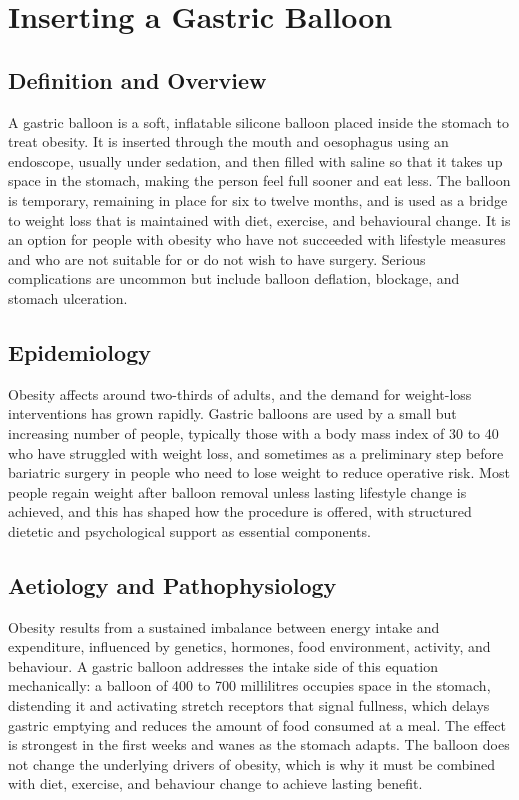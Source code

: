 \chapter{Inserting a Gastric Balloon}

\section*{Definition and Overview}
A gastric balloon is a soft, inflatable silicone balloon placed inside the stomach to treat obesity. It is inserted through the mouth and oesophagus using an endoscope, usually under sedation, and then filled with saline so that it takes up space in the stomach, making the person feel full sooner and eat less. The balloon is temporary, remaining in place for six to twelve months, and is used as a bridge to weight loss that is maintained with diet, exercise, and behavioural change. It is an option for people with obesity who have not succeeded with lifestyle measures and who are not suitable for or do not wish to have surgery. Serious complications are uncommon but include balloon deflation, blockage, and stomach ulceration.

\section*{Epidemiology}
Obesity affects around two-thirds of adults, and the demand for weight-loss interventions has grown rapidly. Gastric balloons are used by a small but increasing number of people, typically those with a body mass index of 30 to 40 who have struggled with weight loss, and sometimes as a preliminary step before bariatric surgery in people who need to lose weight to reduce operative risk. Most people regain weight after balloon removal unless lasting lifestyle change is achieved, and this has shaped how the procedure is offered, with structured dietetic and psychological support as essential components.

\section*{Aetiology and Pathophysiology}
Obesity results from a sustained imbalance between energy intake and expenditure, influenced by genetics, hormones, food environment, activity, and behaviour. A gastric balloon addresses the intake side of this equation mechanically: a balloon of 400 to 700 millilitres occupies space in the stomach, distending it and activating stretch receptors that signal fullness, which delays gastric emptying and reduces the amount of food consumed at a meal. The effect is strongest in the first weeks and wanes as the stomach adapts. The balloon does not change the underlying drivers of obesity, which is why it must be combined with diet, exercise, and behaviour change to achieve lasting benefit.

